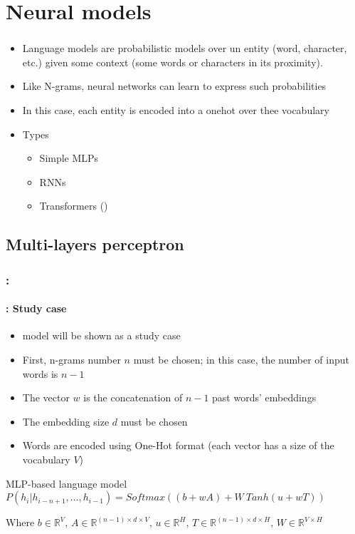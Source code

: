 \documentclass[xcolor=table]{beamer}
\begin{document}
\section{Neural models}

\begin{frame}
	\frametitle{\insertshortsubtitle}
	\framesubtitle{\insertsection}

\begin{itemize}
	\item Language models are probabilistic models over un entity (word, character, etc.) given some context (some words or characters in its proximity).
	\item Like N-grams, neural networks can learn to express such probabilities
	\item In this case, each entity is encoded into a onehot over thee vocabulary
	\item Types
	\begin{itemize}
		\item Simple MLPs
		\item RNNs
		\item Transformers ()
	\end{itemize}
\end{itemize}

\end{frame}

\subsection{Multi-layers perceptron}

\begin{frame}
	\frametitle{\insertshortsubtitle: \insertsection}
	\framesubtitle{\insertsubsection: Study case}

	\begin{itemize}
		\item \cite{2003-bengio-al} model will be shown as a study case
		\item First, n-grams number $n$ must be chosen; in this case, the number of input words is $n-1$
		\item The vector $w$ is the concatenation of $n-1$ past words' embeddings
		\item The embedding size $d$ must be chosen  
		\item Words are encoded using One-Hot format (each vector has a size of the vocabulary $V$)
	\end{itemize}
	
	\begin{block}{MLP-based language model}
		$
		P(h_i|h_{i-n+1},\ldots, h_{i-1}) = 
		Softmax \left(
		(b + w A) 
		+ 
		W\ Tanh(u + w T)
		\right)
		$
		
		Where $b \in \mathbb{R}^{V},\, A \in \mathbb{R}^{(n-1) \times d \times V},\, u \in \mathbb{R}^{H},\, T \in \mathbb{R}^{(n-1) \times d \times H},\, W \in \mathbb{R}^{V \times H}$
	\end{block}

\end{frame}
\end{document}
